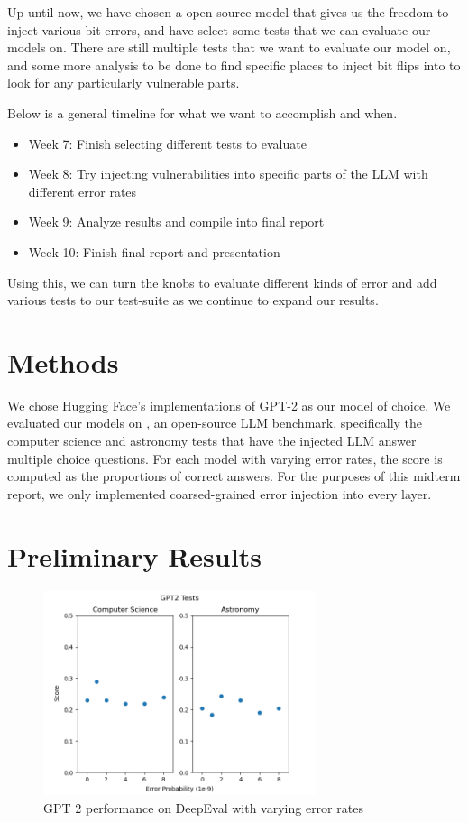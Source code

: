 \documentclass[a4paper]{article}
\begin{document}
Up until now, we have chosen a open source model that gives us the freedom to inject various bit errors, and have select some tests that we can evaluate our models on. There are still multiple tests that we want to evaluate our model on, and some more analysis to be done to find specific places to inject bit flips into to look for any particularly vulnerable parts.

Below is a general timeline for what we want to accomplish and when.

\begin{itemize}
	\item Week 7: Finish selecting different tests to evaluate
	\item Week 8: Try injecting vulnerabilities into specific parts of the LLM with different error rates
	\item Week 9: Analyze results and compile into final report
	\item  Week 10: Finish final report and presentation
\end{itemize}

Using this, we can turn the knobs to evaluate different kinds of error and add various tests to our test-suite as we continue to expand our results.


\section{Methods}

We chose Hugging Face's implementations of GPT-2 \cite{gpt2} as our model of choice. We evaluated our models on \cite{DeepEval}, an open-source LLM benchmark, specifically the computer science and astronomy tests that have the injected LLM answer multiple choice questions. For each model with varying error rates, the score is computed as the proportions of correct answers. For the purposes of this midterm report, we only implemented coarsed-grained error injection into every layer.


\section{Preliminary Results}
\begin{figure}[ht]
	\begin{center}
		\includegraphics[height=6cm]{gpt2.png}
		\caption{GPT 2 performance on DeepEval with varying error rates}
		\label{gpt2-res}
	\end{center}
\end{figure}
\end{document}
